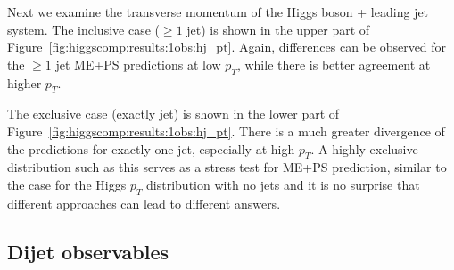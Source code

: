 Next we examine the transverse momentum of the Higgs boson + leading
jet system. The inclusive case ($\ge 1$ jet) is shown in the upper
part of Figure~\ref{fig:higgscomp:results:1obs:hj_pt}.  Again,
differences can be observed for the $\ge 1$ jet ME+PS predictions at
low $p_T$, while there is better agreement at higher $p_T$.


The exclusive case (exactly jet) is shown in the lower part of
Figure~\ref{fig:higgscomp:results:1obs:hj_pt}.  There is a much
greater divergence of the predictions for exactly one jet, especially
at high $p_T$.  A highly exclusive distribution such as this serves as
a stress test for ME+PS prediction, similar to the case for the Higgs
$p_T$ distribution with no jets and it is no surprise that different
approaches can lead to different answers.



\clearpage
\subsection{Dijet observables}
\label{sec:hjetscomp:results:2jobs}

